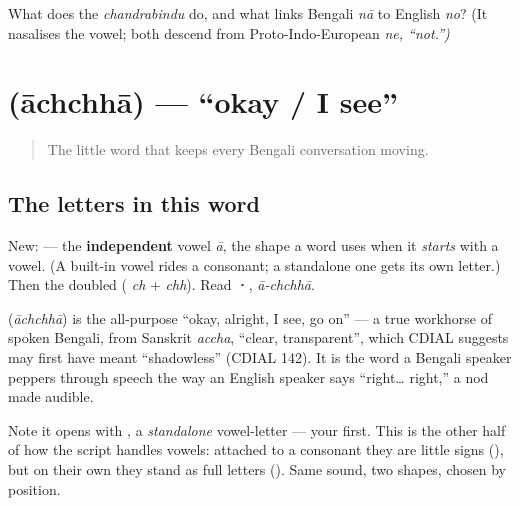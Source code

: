 \begin{tcolorbox}[breakable,colback=teal!4,colframe=teal!35!black,title={Before you move on}]
What does the \emph{chandrabindu} do, and what links Bengali \emph{nā} to English \emph{no}? (It nasalises the vowel; both descend from Proto-Indo-European \emph{ne, \textquotedblleft{}not.\textquotedblright{})}
\end{tcolorbox}
\section[\texorpdfstring{\bn{আচ্ছা} (āchchhā)}{আচ্ছা (āchchhā)}]{ (āchchhā) — \textquotedblleft{}okay / I see\textquotedblright{}}

\label{lesson:BN-C01-achchha}



\begin{quote}
The little word that keeps every Bengali conversation moving.
\end{quote}

\subsection*{The letters in this word}
New: \textbf{} — the \textbf{independent} vowel \emph{ā}, the shape a word uses when it \emph{starts} with a vowel. (A built-in vowel rides a consonant; a standalone one gets its own letter.) Then the doubled \textbf{} (\textbf{} \emph{ch} + \textbf{} \emph{chh}). Read \textbf{·}, \emph{ā-chchhā}.

\begin{cousinweb}
\textbf{} (\emph{āchchhā}) is the all-purpose \textquotedblleft{}okay, alright, I see, go on\textquotedblright{} — a true workhorse of spoken Bengali, from Sanskrit \emph{accha}, \textquotedblleft{}clear, transparent\textquotedblright{}, which CDIAL suggests may first have meant \textquotedblleft{}shadowless\textquotedblright{} (CDIAL 142). It is the word a Bengali speaker peppers through speech the way an English speaker says \textquotedblleft{}right… right,\textquotedblright{} a nod made audible.
\end{cousinweb}

\begin{culture}
Note it opens with \textbf{}, a \emph{standalone} vowel-letter — your first. This is the other half of how the script handles vowels: attached to a consonant they are little signs (\textbf{}), but on their own they stand as full letters (\textbf{}). Same sound, two shapes, chosen by position.
\end{culture}

